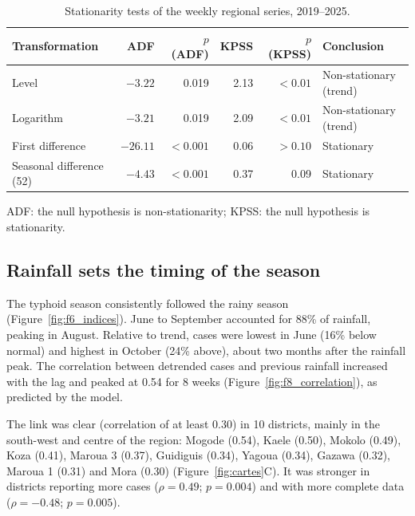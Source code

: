 \documentclass[11pt]{article}
\begin{document}
\begin{table}[!htbp]\centering\small
\caption{Stationarity tests of the weekly regional series, 2019–2025.}\label{tab:stat}
\begin{tabularx}{\linewidth}{@{}L rrrr L@{}}\toprule
Transformation & ADF & $p$ (ADF) & KPSS & $p$ (KPSS) & Conclusion \\\midrule
Level & $-3.22$ & 0.019 & 2.13 & $<0.01$ & Non-stationary (trend) \\
Logarithm & $-3.21$ & 0.019 & 2.09 & $<0.01$ & Non-stationary (trend) \\
First difference & $-26.11$ & $<0.001$ & 0.06 & $>0.10$ & Stationary \\
Seasonal difference (52) & $-4.43$ & $<0.001$ & 0.37 & 0.09 & Stationary \\\bottomrule
\end{tabularx}
\par\smallskip\raggedright ADF: the null hypothesis is non-stationarity; KPSS: the null hypothesis is stationarity.
\end{table}


\subsection{Rainfall sets the timing of the season}
The typhoid season consistently followed the rainy season (Figure~\ref{fig:f6_indices}). June to September accounted for 88\% of rainfall, peaking in August. Relative to trend, cases were lowest in June (16\% below normal) and highest in October (24\% above), about two months after the rainfall peak. The correlation between detrended cases and previous rainfall increased with the lag and peaked at 0.54 for 8 weeks (Figure~\ref{fig:f8_correlation}), as predicted by the model.



The link was clear (correlation of at least 0.30) in 10 districts, mainly in the south-west and centre of the region: Mogode (0.54), Kaele (0.50), Mokolo (0.49), Koza (0.41), Maroua 3 (0.37), Guidiguis (0.34), Yagoua (0.34), Gazawa (0.32), Maroua 1 (0.31) and Mora (0.30) (Figure~\ref{fig:cartes}C). It was stronger in districts reporting more cases ($\rho=0.49$; $p=0.004$) and with more complete data ($\rho=-0.48$; $p=0.005$).
\end{document}
